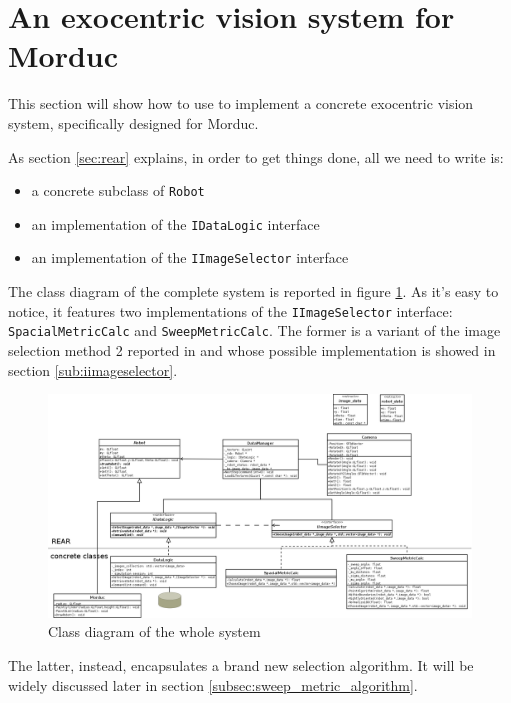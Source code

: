 \section{An exocentric vision system for Morduc}
\label{sec:concr}
This section will show how to use \framework{} to implement a 
concrete exocentric vision system, specifically designed for 
Morduc.
%

%
As section \ref{sec:rear} explains, in order to get things 
done, all we need to write is:
\begin{itemize}
\item a concrete subclass of \texttt{Robot}
\item an implementation of the \texttt{IDataLogic} interface
\item an implementation of the \texttt{IImageSelector} interface
\end{itemize}
%
The class diagram of the complete system is reported in figure 
\ref{fig:class_diagram_complete}. 
%
As it's easy to notice, it features two implementations 
of the \texttt{IImageSelector} interface: \texttt{SpacialMetricCalc} 
and \texttt{SweepMetricCalc}. The former is a variant 
of the image selection method 2 reported in \cite{sugimoto} and 
whose possible implementation is showed in section 
\ref{sub:iimageselector}.
%

%
\begin{figure}[!h]
  \begin{center}
    \includegraphics[width=400pt]{img/class_diagram.png} 
    \caption{Class diagram of the whole system}
    \label{fig:class_diagram_complete}
  \end{center}
\end{figure}
%

The latter, instead, encapsulates a brand new selection algorithm. 
It will be widely discussed later in section 
\ref{subsec:sweep_metric_algorithm}.


